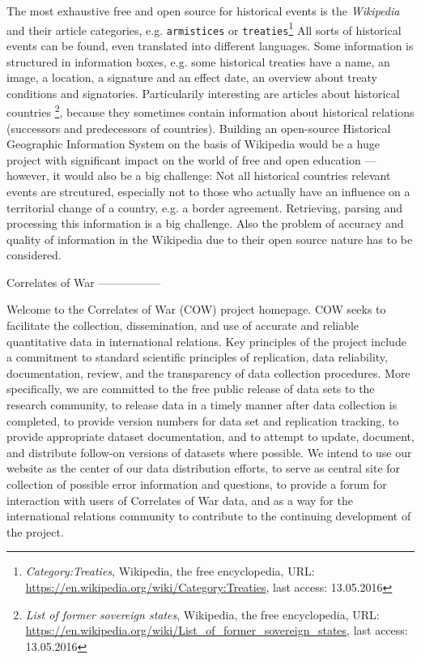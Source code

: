 The most exhaustive free and open source for historical events is the \emph{Wikipedia} and their article categories, e.g. \texttt{armistices} or \texttt{treaties}\footnote{
  \textit{Category:Treaties},
  Wikipedia, the free encyclopedia,
  URL: \url{https://en.wikipedia.org/wiki/Category:Treaties},
  last access: 13.05.2016
}
All sorts of historical events can be found, even translated into different languages. Some information is structured in information boxes, e.g. some historical treaties have a name, an image, a location, a signature and an effect date, an overview about treaty conditions and signatories.
Particularily interesting are articles about historical countries \footnote{
  \textit{List of former sovereign states},
  Wikipedia, the free encyclopedia,
  URL: \url{https://en.wikipedia.org/wiki/List_of_former_sovereign_states},
  last access: 13.05.2016
},
because they sometimes contain information about historical relations (successors and predecessors of countries). Building an open-source Historical Geographic Information System on the basis of Wikipedia would be a huge project with significant impact on the world of free and open education --- however, it would also be a big challenge: Not all historical countries relevant events are strcutured, especially not to those who actually have an influence on a territorial change of a country, e.g. a border agreement. Retrieving, parsing and processing this information is a big challenge. Also the problem of accuracy and quality of information in the Wikipedia due to their open source nature has to be considered.


Correlates of War
-----------------

Welcome to the Correlates of War (COW) project homepage. COW seeks to facilitate the collection, dissemination, and use of accurate and reliable quantitative data in international relations. Key principles of the project include a commitment to standard scientific principles of replication, data reliability, documentation, review, and the transparency of data collection procedures. More specifically, we are committed to the free public release of data sets to the research community, to release data in a timely manner after data collection is completed, to provide version numbers for data set and replication tracking, to provide appropriate dataset documentation, and to attempt to update, document, and distribute follow-on versions of datasets where possible. We intend to use our website as the center of our data distribution efforts, to serve as central site for collection of possible error information and questions, to provide a forum for interaction with users of Correlates of War data, and as a way for the international relations community to contribute to the continuing development of the project.

